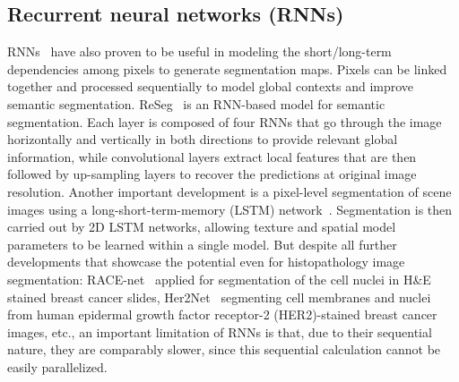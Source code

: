 \subsection{Recurrent neural networks (RNNs)}
RNNs~\cite{rumelhart1986learning} have also proven to be useful in modeling the short/long-term dependencies among pixels to generate segmentation maps. Pixels can be linked together and processed sequentially to model global contexts and improve semantic segmentation. ReSeg~\cite{visin2016reseg} is an RNN-based model for semantic segmentation. Each layer is composed of four RNNs that go through the image horizontally and vertically in both directions to provide relevant global information, while convolutional layers extract local features that are then followed by up-sampling layers to recover the predictions at original image resolution. Another important development is a pixel-level segmentation of scene images using a long-short-term-memory (LSTM) network~\cite{byeon2015scene}. Segmentation is then carried out by 2D LSTM networks, allowing texture and spatial model parameters to be learned within a single model. But despite all further developments that showcase the potential even for histopathology image segmentation: RACE-net~\cite{chakravarty2018race} applied for segmentation of the cell nuclei in H\&E stained breast cancer slides, Her2Net~\cite{saha2018her2net} segmenting cell membranes and nuclei from human epidermal growth factor receptor-2 (HER2)-stained breast cancer images, etc., 
an important limitation of RNNs is that, due to their sequential nature, they are comparably slower, since this sequential calculation cannot be easily parallelized. 

